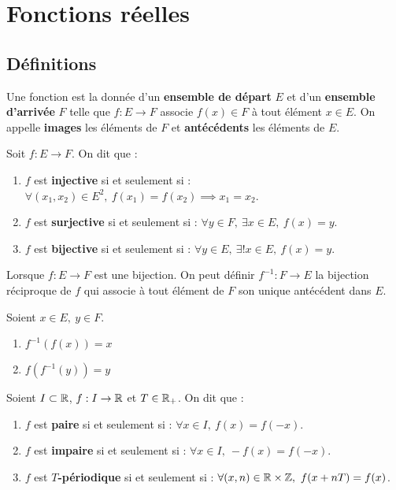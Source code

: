 \chapter{Fonctions réelles}

\section{Définitions}
\begin{definition}[Fonction]
	Une fonction est la donnée d'un \textbf{ensemble de départ} $E$ et d'un \textbf{ensemble d'arrivée} $F$ telle que 
	$ f : E \to F $
	associe $f(x) \in F$ à tout élément $x \in E$.
	On appelle \textbf{images} les éléments de $F$ et \textbf{antécédents} les éléments de $E$.
\end{definition}

\begin{definition}
	Soit $f : E \to F$. On dit que :
    \begin{enumerate}
        \item $f$ est \textbf{injective} si et seulement si : $\forall (x_1, x_2) \in E^2,\ f(x_1) = f(x_2) \implies x_1 = x_2$.
        \item $f$ est \textbf{surjective} si et seulement si : $\forall y \in F,\ \exists x \in E,\ f(x) = y$.
        \item $f$ est \textbf{bijective} si et seulement si : $\forall y \in E,\ \exists ! x \in E,\ f(x) = y$.
    \end{enumerate}
\end{definition}

\begin{definition}
	Lorsque $f : E \to F$ est une bijection. On peut définir $f^{-1} : F \to E$ la bijection réciproque de $f$ qui associe à tout élément de $F$ son unique antécédent dans $E$.
\end{definition}

\begin{proposition}
	Soient $x \in E,\ y \in F$.
    \begin{multicols}{2}
        \begin{enumerate}
            \item $f^{-1} (f(x)) = x$
            \item $f(f^{-1}(y)) = y$
        \end{enumerate}
    \end{multicols}
\end{proposition}

\begin{definition}
	Soient $I \subset \mathbb{R}$, $f : I \to \mathbb{R}$ et $T \in \mathbb{R}_+$. On dit que :
    \begin{enumerate}
        \item $f$ est \textbf{paire} si et seulement si : $\forall x \in I,\ f(x) = f(-x)$.
        \item $f$ est \textbf{impaire} si et seulement si : $\forall x \in I,\ -f(x) = f(-x)$.
        \item $f$ est \textbf{$T$-périodique} si et seulement si : $\forall (x,n) \in \mathbb{R} \times \mathbb{Z},\ f(x + nT) = f(x)$.
    \end{enumerate}
\end{definition}

